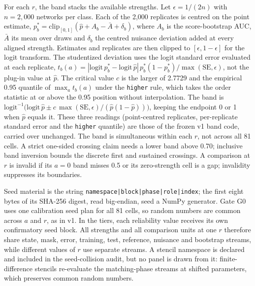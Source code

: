 For each $r$, the band stacks the available strengths. %
Let $\epsilon=1/(2n)$ with $n=2{,}000$ networks per class. %
Each of the 2,000 replicates is centred on the point estimate, $p^*_b=\mathrm{clip}_{[0,1]}(\hat p+A_b-\bar A+\delta_b)$, where $A_b$ is the score-bootstrap AUC, $\bar A$ its mean over draws and $\delta_b$ the centred nuisance deviation added at every aligned strength. %
Estimates and replicates are then clipped to $[\epsilon,1-\epsilon]$ for the logit transform. %
The studentized deviation uses the logit standard error evaluated at each replicate, $t_b(a)=|\mathrm{logit}\,p^*_b-\mathrm{logit}\,\hat p|\,p^*_b(1-p^*_b)/\max(\mathrm{SE},\epsilon)$, not the plug-in value at $\hat p$. %
The critical value $c$ is the larger of 2.7729 and the empirical 0.95 quantile of $\max_a t_b(a)$ under the \texttt{higher} rule, which takes the order statistic at or above the 0.95 position without interpolation. %
The band is $\mathrm{logit}^{-1}\bigl(\mathrm{logit}\,\hat p\pm c\,\max(\mathrm{SE},\epsilon)/(\hat p(1-\hat p))\bigr)$, keeping the endpoint 0 or 1 when $\hat p$ equals it. %
These three readings (point-centred replicates, per-replicate standard error and the \texttt{higher} quantile) are those of the frozen v1 band code, carried over unchanged. %
The band is simultaneous within each $r$, not across all 81 cells. %
A strict one-sided crossing claim needs a lower band above 0.70; inclusive band inversion bounds the discrete first and sustained crossings. %
A comparison at $r$ is invalid if its $a=0$ band misses 0.5 or its zero-strength cell is a gap; invalidity suppresses its boundaries. %

Seed material is the string \texttt{namespace|block|phase|role|index}; the first eight bytes of its SHA-256 digest, read big-endian, seed a NumPy generator. %
Gate G0 uses one calibration seed plan for all 81 cells, so random numbers are common across $a$ and $r$, as in v1. %
In the tiers, each reliability value receives its own confirmatory seed block. %
All strengths and all comparison units at one $r$ therefore share state, mask, error, training, test, reference, nuisance and bootstrap streams, while different values of $r$ use separate streams. %
A stencil namespace is declared and included in the seed-collision audit, but no panel is drawn from it: finite-difference stencils re-evaluate the matching-phase streams at shifted parameters, which preserves common random numbers. %

